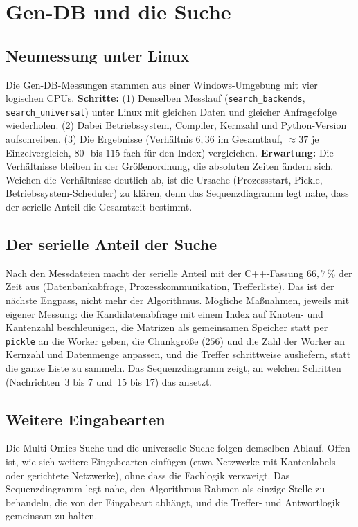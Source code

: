 \section{Gen-DB und die Suche}

\subsection{Neumessung unter Linux}

Die Gen-DB-Messungen stammen aus einer Windows-Umgebung mit vier logischen CPUs. \textbf{Schritte:} (1) Denselben Messlauf (\texttt{search\_backends}, \texttt{search\_universal}) unter Linux mit gleichen Daten und gleicher Anfragefolge wiederholen. (2) Dabei Betriebssystem, Compiler, Kernzahl und Python-Version aufschreiben. (3) Die Ergebnisse (Verhältnis $6{,}36$ im Gesamtlauf, $\approx37$ je Einzelvergleich, $80$- bis $115$-fach für den Index) vergleichen. \textbf{Erwartung:} Die Verhältnisse bleiben in der Größenordnung, die absoluten Zeiten ändern sich. Weichen die Verhältnisse deutlich ab, ist die Ursache (Prozessstart, Pickle, Betriebssystem-Scheduler) zu klären, denn das Sequenzdiagramm legt nahe, dass der serielle Anteil die Gesamtzeit bestimmt.

\subsection{Der serielle Anteil der Suche}

Nach den Messdateien macht der serielle Anteil mit der C++-Fassung $66{,}7\,\%$ der Zeit aus (Datenbankabfrage, Prozesskommunikation, Trefferliste). Das ist der nächste Engpass, nicht mehr der Algorithmus. Mögliche Maßnahmen, jeweils mit eigener Messung: die Kandidatenabfrage mit einem Index auf Knoten- und Kantenzahl beschleunigen, die Matrizen als gemeinsamen Speicher statt per \texttt{pickle} an die Worker geben, die Chunkgröße ($256$) und die Zahl der Worker an Kernzahl und Datenmenge anpassen, und die Treffer schrittweise ausliefern, statt die ganze Liste zu sammeln. Das Sequenzdiagramm zeigt, an welchen Schritten (Nachrichten~3 bis 7 und~15 bis 17) das ansetzt.

\subsection{Weitere Eingabearten}

Die Multi-Omics-Suche und die universelle Suche folgen demselben Ablauf. Offen ist, wie sich weitere Eingabearten einfügen (etwa Netzwerke mit Kantenlabels oder gerichtete Netzwerke), ohne dass die Fachlogik verzweigt. Das Sequenzdiagramm legt nahe, den Algorithmus-Rahmen als einzige Stelle zu behandeln, die von der Eingabeart abhängt, und die Treffer- und Antwortlogik gemeinsam zu halten.

